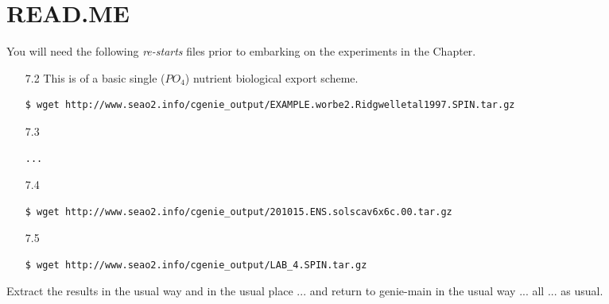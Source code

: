 \documentclass[11pt,fleqn]{book} %
\begin{document}
\vspace{24mm}

\noindent


\newpage



\section*{READ.ME}

You will need the following \textit{re-starts} files prior to embarking on the experiments in the Chapter.
\vspace{1mm}

\begin{itemize}[noitemsep]
\vspace{1mm}
\item [7.2] This is of a basic single (\(PO_{4}\)) nutrient biological export scheme.
\small \begin{verbatim}
$ wget http://www.seao2.info/cgenie_output/EXAMPLE.worbe2.Ridgwelletal1997.SPIN.tar.gz
\end{verbatim} \normalsize
\vspace{1mm}
\item [7.3] 
\small \begin{verbatim}
...
\end{verbatim} \normalsize
\vspace{1mm}
\item [7.4] 
\small \begin{verbatim}
$ wget http://www.seao2.info/cgenie_output/201015.ENS.solscav6x6c.00.tar.gz
\end{verbatim} \normalsize
\vspace{1mm}
\item [7.5] 
\small \begin{verbatim}
$ wget http://www.seao2.info/cgenie_output/LAB_4.SPIN.tar.gz
\end{verbatim} \normalsize
\end{itemize}
\vspace{1mm}

\noindent Extract the results in the usual way and in the usual place ... and return to \textsf{\footnotesize genie-main} in the usual way ... all ... as usual.


\newpage
\end{document}
